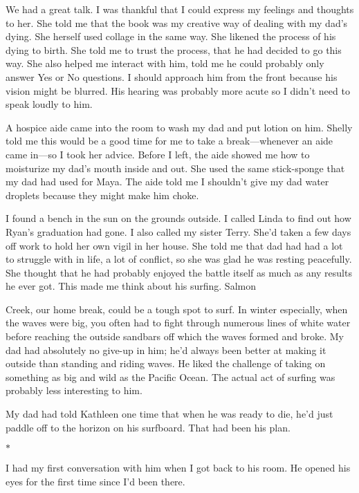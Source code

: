 \documentclass[12pt]{book}
\begin{document}
We had a great talk. I was thankful that I could express my feelings and thoughts to her. She told me that the book was my creative way of dealing with my dad's dying. She herself used collage in the same way. She likened the process of his dying to birth. She told me to trust the process, that he had decided to go this way. She also helped me interact with him, told me he could probably only answer Yes or No questions. I should approach him from the front because his vision might be blurred. His hearing was probably more acute so I didn't need to speak loudly to him.

A hospice aide came into the room to wash my dad and put lotion on him. Shelly told me this would be a good time for me to take a break---whenever an aide came in---so I took her advice. Before I left, the aide showed me how to moisturize my dad's mouth inside and out. She used the same stick-sponge that my dad had used for Maya. The aide told me I shouldn't give my dad water droplets because they might make him choke.

I found a bench in the sun on the grounds outside. I called Linda to find out how Ryan's graduation had gone. I also called my sister Terry. She'd taken a few days off work to hold her own vigil in her house. She told me that dad had had a lot to struggle with in life, a lot of conflict, so she was glad he was resting peacefully. She thought that he had probably enjoyed the battle itself as much as any results he ever got. This made me think about his surfing. Salmon

Creek, our home break, could be a tough spot to surf. In winter especially, when the waves were big, you often had to fight through numerous lines of white water before reaching the outside sandbars off which the waves formed and broke. My dad had absolutely no give-up in him; he'd always been better at making it outside than standing and riding waves. He liked the challenge of taking on something as big and wild as the Pacific Ocean. The actual act of surfing was probably less interesting to him.

My dad had told Kathleen one time that when he was ready to die, he'd just paddle off to the horizon on his surfboard. That had been his plan.

\begin{center}$*$\end{center}

I had my first conversation with him when I got back to his room. He opened his eyes for the first time since I'd been there.
\end{document}
